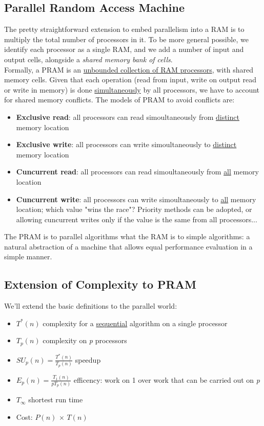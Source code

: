 \documentclass{article}
\begin{document}
		\subsection{Parallel Random Access Machine}
			The pretty straightforward extension to embed parallelism into a RAM is to multiply the total number of processors in it. To be more general possible, we identify each processor as a single RAM, and we add a number of input and output cells, alongside a \textit{shared memory bank of cells}.\\
			Formally, a PRAM is an \underline{unbounded collection of RAM processors}, with shared memory cells. Given that each operation (read from input, write on output read or write in memory) is done \underline{simultaneously} by all processors, we have to account for shared memory conflicts. The models of PRAM to avoid conflicts are:
			\begin{itemize}
				\item \textbf{Exclusive read}: all processors can read simoultaneously from \underline{distinct} memory location
				\item \textbf{Exclusive write}: all processors can write simoultaneously to \underline{distinct} memory location
				\item \textbf{Cuncurrent read}: all processors can read simoultaneously from \underline{all} memory location
				\item \textbf{Cuncurrent write}: all processors can write simoultaneously to \underline{all} memory location; which value "wins the race"? Priority methods can be adopted, or allowing cuncurrent writes only if the value is the same from all processors...
			\end{itemize}
			The PRAM is to parallel algorithms what the RAM is to simple algorithms: a natural abstraction of a machine that allows equal performance evaluation in a simple manner.

		\subsection{Extension of Complexity to PRAM}
			We'll extend the basic definitions to the parallel world:
			\begin{itemize}
				\item $T^*(n)$ complexity for a \underline{sequential} algorithm on a single processor
				\item $T_p(n)$ complexity on \emph{p} processors
				\item $SU_p(n) = \frac{T^*(n)}{T_p(n)}$ speedup
				\item $E_p(n) = \frac{T_1(n)}{pT_p(n)}$ efficency: work on 1 over work that can be carried out on \emph{p}
				\item $T_{\infty}$ shortest run time
				\item Cost: $P(n)\, \times\, T(n)$ 
			\end{itemize}
\end{document}
